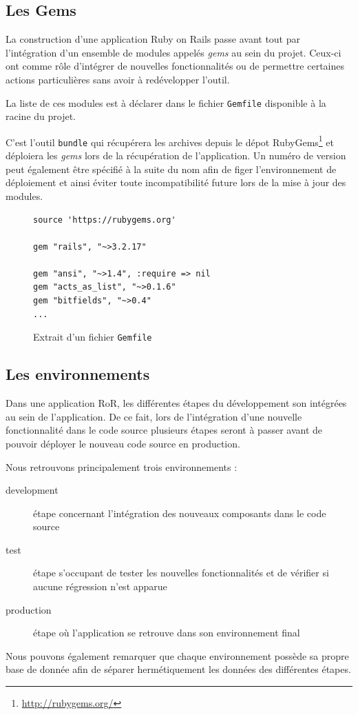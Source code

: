 \documentclass[12pt,a4paper]{book}
\begin{document}
\subsection{Les Gems}

La construction d'une application Ruby on Rails passe avant tout par l'intégration d'un ensemble de modules appelés \textit{gems} au sein du projet. Ceux-ci ont comme rôle d'intégrer de nouvelles fonctionnalités ou de permettre certaines actions particulières sans avoir à redévelopper l'outil. 

La liste de ces modules est à déclarer dans le fichier \texttt{Gemfile} disponible à la racine du projet.

C'est l'outil \texttt{bundle} qui récupérera les archives depuis le dépot RubyGems\footnote{\url{http://rubygems.org/}} et déploiera les \textit{gems} lors de la récupération de l'application. Un numéro de version peut également être spécifié à la suite du nom afin de figer l'environnement de déploiement et ainsi éviter toute incompatibilité future lors de la mise à jour des modules.

\begin{figure}[h]
\lstset{language=ruby}
\begin{lstlisting}
source 'https://rubygems.org'

gem "rails", "~>3.2.17"

gem "ansi", "~>1.4", :require => nil
gem "acts_as_list", "~>0.1.6"
gem "bitfields", "~>0.4"
...
\end{lstlisting}
 \caption{Extrait d'un fichier \texttt{Gemfile}}
\end{figure}

\subsection{Les environnements}

Dans une application RoR, les différentes étapes du développement son intégrées au sein de l'application. De ce fait, lors de l'intégration d'une nouvelle fonctionnalité dans le code source plusieurs étapes seront à passer avant de pouvoir déployer le nouveau code source en production.

Nous retrouvons principalement trois environnements :
\begin{description}
	\item[development] étape concernant l'intégration des nouveaux composants dans le code source
	\item[test] étape s'occupant de tester les nouvelles fonctionnalités et de vérifier si aucune régression n'est apparue 
	\item[production] étape où l'application se retrouve dans son environnement final
\end{description}
Nous pouvons également remarquer que chaque environnement possède sa propre base de donnée afin de séparer hermétiquement les données des différentes étapes. 
\end{document}
